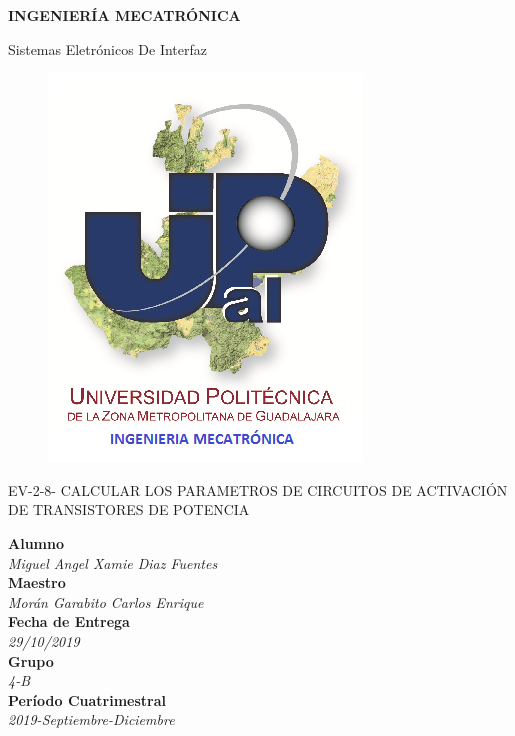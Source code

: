 \documentclass[11pt,a4paper]{article}
\author{Miguel Angel Xamie Diaz Fuentes}
\begin{document}
\begin{center}
\begin{LARGE}
\textbf{INGENIERÍA MECATRÓNICA}\\
\end{LARGE}
{\large Sistemas Eletrónicos De Interfaz}\\
\begin{figure}[hbtp]
\centering
\includegraphics[scale=0.80]{UPZMG_Mecatr_nica.png}
\end{figure} 
\begin{center}
\begin{LARGE}
EV-2-8- CALCULAR LOS PARAMETROS DE CIRCUITOS DE ACTIVACIÓN DE TRANSISTORES DE POTENCIA
\end{LARGE}
\end{center}

\begin{Large}
\textbf{Alumno}
\\\textit{Miguel Angel Xamie Diaz Fuentes}
\textbf{\\Maestro}
\\\textit{Morán Garabito Carlos Enrique}
\textbf{\\Fecha de Entrega}
\\\textit{29/10/2019}
\textbf{\\Grupo}
\\\textit{4-B}\\
\textbf{Período Cuatrimestral}\\
\textit{2019-Septiembre-Diciembre}
\\
\end{Large}

\end{center}
\end{document}
